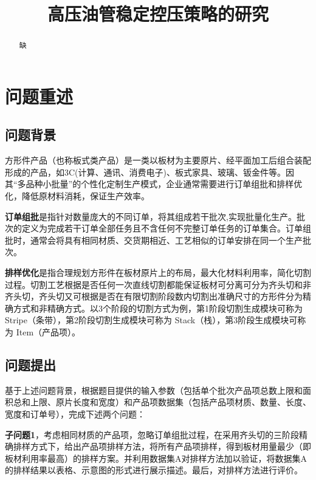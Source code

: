 \documentclass[bwprint]{gmcmthesis}
\title{高压油管稳定控压策略的研究}
\begin{document}
\sloppy

 \maketitle

\begin{abstract}
缺
\end{abstract}


\section{问题重述}
\subsection{问题背景}

方形件产品（也称板式类产品）是一类以板材为主要原片、经平面加工后组合装配形成的产品，如3C(计算、通讯、消费电子)、板式家具、玻璃、钣金件等。因其“多品种小批量”的个性化定制生产模式，企业通常需要进行订单组批和排样优化，降低原材料消耗，保证生产效率。

\textbf{订单组批}是指针对数量庞大的不同订单，将其组成若干批次,实现批量化生产。批次的定义为完成若干订单全部任务且不含任何不完整订单任务的订单集合。订单组批时，通常会将具有相同材质、交货期相近、工艺相似的订单安排在同一个生产批次。

\textbf{排样优化}是指合理规划方形件在板材原片上的布局，最大化材料利用率，简化切割过程。切割工艺根据是否任何一次直线切割都能保证板材可分离可分为齐头切和非齐头切，齐头切又可根据是否在有限切割阶段数内切割出准确尺寸的方形件分为精确方式和非精确方式。以3个阶段的切割方式为例，第1阶段切割生成模块可称为 {\rm Stripe}（条带），第2阶段切割生成模块可称为 {\rm Stack}（栈），第3阶段生成模块可称为 {\rm Item}（产品项）。

\quad
\subsection{问题提出}
基于上述问题背景，根据题目提供的输入参数（包括单个批次产品项总数上限和面积总和上限、原片长度和宽度）和产品项数据集（包括产品项材质、数量、长度、宽度和订单号），完成下述两个问题：

\textbf{子问题1}，考虑相同材质的产品项，忽略订单组批过程，在采用齐头切的三阶段精确排样方式下，给出产品项排样方法，将所有产品项排样，得到板材用量最少（即板材利用率最高）的排样方案。并利用数据集A对排样方法加以验证，将数据集A的排样结果以表格、示意图的形式进行展示描述。最后，对排样方法进行评价。
\end{document}
